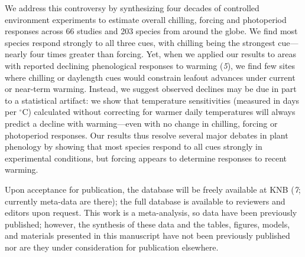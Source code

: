 \documentclass[10.5pt,a4paper]{letter}
\begin{document}
\begin{letter}{}
\par We address this controversy by synthesizing four decades of controlled environment experiments to estimate overall chilling, forcing and photoperiod responses across 66 studies and 203 species from around the globe. We find most species respond strongly to all three cues, with chilling being the strongest cue---nearly four times greater than forcing. Yet, when we applied our results to areas with reported declining phenological responses to warming (\emph{5}), we find few sites where chilling or daylength cues would constrain leafout advances under current or near-term warming. Instead, we suggest observed declines may be due in part to a statistical artifact: we show that temperature sensitivities (measured in days per $^{\circ}$C) calculated without correcting for warmer daily temperatures will always predict a decline with warming---even with no change in chilling, forcing or photoperiod responses. %
Our results thus resolve several major debates in plant phenology by showing that most species respond to all cues strongly in experimental conditions, but forcing appears to determine responses to recent warming. %

\par Upon acceptance for publication, the database will be freely available at KNB (\emph{7}; currently meta-data are there); the full database is available to reviewers and editors upon request. This work is a meta-analysis, so data have been previously published; however, the synthesis of these data and the tables, figures, models, and materials presented in this manuscript have not been previously published nor are they under consideration for publication elsewhere.


\end{letter}
\end{document}
